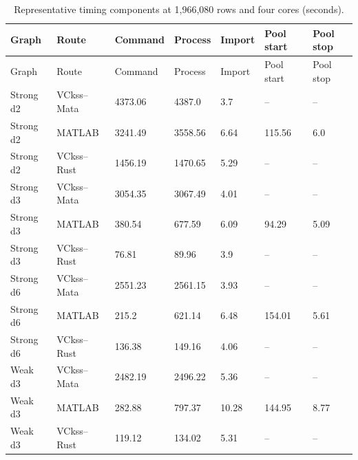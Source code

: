 \begingroup
\small
\setlength{\tabcolsep}{4pt}
\begin{longtable}{lllllll}
\caption{Representative timing components at 1,966,080 rows and four cores (seconds).}\label{tab:timing-components}\\
\toprule
Graph & Route & Command & Process & Import & Pool start & Pool stop \\
\midrule
\endfirsthead
\toprule
Graph & Route & Command & Process & Import & Pool start & Pool stop \\
\midrule
\endhead
Strong d2 & VCkss--Mata & 4373.06 & 4387.0 & 3.7 & -- & -- \\
Strong d2 & MATLAB & 3241.49 & 3558.56 & 6.64 & 115.56 & 6.0 \\
Strong d2 & VCkss--Rust & 1456.19 & 1470.65 & 5.29 & -- & -- \\
Strong d3 & VCkss--Mata & 3054.35 & 3067.49 & 4.01 & -- & -- \\
Strong d3 & MATLAB & 380.54 & 677.59 & 6.09 & 94.29 & 5.09 \\
Strong d3 & VCkss--Rust & 76.81 & 89.96 & 3.9 & -- & -- \\
Strong d6 & VCkss--Mata & 2551.23 & 2561.15 & 3.93 & -- & -- \\
Strong d6 & MATLAB & 215.2 & 621.14 & 6.48 & 154.01 & 5.61 \\
Strong d6 & VCkss--Rust & 136.38 & 149.16 & 4.06 & -- & -- \\
Weak d3 & VCkss--Mata & 2482.19 & 2496.22 & 5.36 & -- & -- \\
Weak d3 & MATLAB & 282.88 & 797.37 & 10.28 & 144.95 & 8.77 \\
Weak d3 & VCkss--Rust & 119.12 & 134.02 & 5.31 & -- & -- \\
\bottomrule
\end{longtable}
\endgroup
